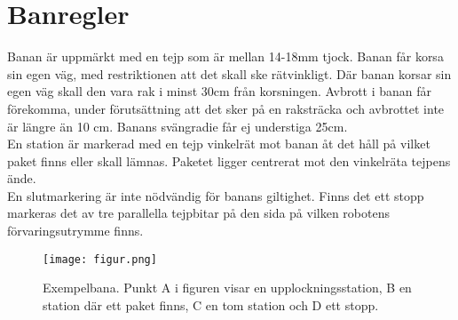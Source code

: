 \section{Banregler} \label{banregler}

Banan är uppmärkt med en tejp som är mellan 14-18mm tjock. Banan får korsa sin egen väg, med restriktionen att det skall ske rätvinkligt. Där banan korsar sin egen väg skall den vara rak i minst 30cm från korsningen. Avbrott i banan får förekomma, under förutsättning att det sker på en raksträcka och avbrottet inte är längre än 10 cm. Banans svängradie får ej understiga 25cm. \\
En station är markerad med en tejp vinkelrät mot banan åt det håll på vilket paket finns eller skall lämnas. Paketet ligger centrerat mot den vinkelräta tejpens ände. \\
En slutmarkering är inte nödvändig för banans giltighet. Finns det ett stopp markeras det av tre parallella tejpbitar på den sida på vilken robotens förvaringsutrymme finns. \\

\begin{figure}[h]
\center
\texttt{[image: figur.png]}
\endcenter
\caption{Exempelbana. Punkt A i figuren visar en upplockningsstation, B en station där ett paket finns, C en tom station och D ett stopp.}
\end{figure}